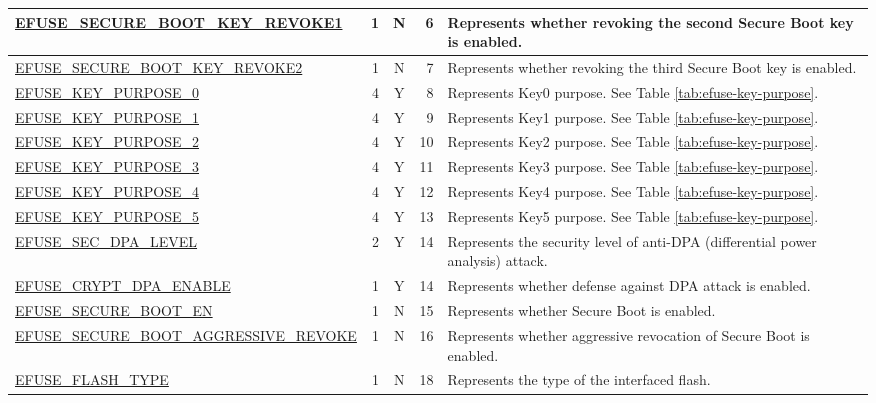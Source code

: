 \begin{longtable}[l]{ |m{8.2cm}|r|c|r|m{9cm}| }
    \hline
    \hyperref[fielddesc:EFUSESECUREBOOTKEYREVOKE1]{EFUSE\_SECURE\_BOOT\_KEY\_REVOKE1} & 1 & N & 6 & Represents whether revoking the second Secure Boot key is enabled.\\
    \hline
    \hyperref[fielddesc:EFUSESECUREBOOTKEYREVOKE2]{EFUSE\_SECURE\_BOOT\_KEY\_REVOKE2} & 1 & N & 7 & Represents whether revoking the third Secure Boot key is enabled.\\
    \hline
    \hyperref[fielddesc:EFUSEKEYPURPOSE0]{EFUSE\_KEY\_PURPOSE\_0} & 4 & Y & 8 & {Represents Key0 purpose. See Table \ref{tab:efuse-key-purpose}.} \\
    \hline
    \hyperref[fielddesc:EFUSEKEYPURPOSE1]{EFUSE\_KEY\_PURPOSE\_1} & 4 & Y & 9 & {Represents Key1 purpose. See Table \ref{tab:efuse-key-purpose}.} \\
    \hline
    \hyperref[fielddesc:EFUSEKEYPURPOSE2]{EFUSE\_KEY\_PURPOSE\_2} & 4 & Y & 10 & {Represents Key2 purpose. See Table \ref{tab:efuse-key-purpose}.} \\
    \hline
    \hyperref[fielddesc:EFUSEKEYPURPOSE3]{EFUSE\_KEY\_PURPOSE\_3} & 4 & Y & 11 & {Represents Key3 purpose. See Table \ref{tab:efuse-key-purpose}.} \\
    \hline
    \hyperref[fielddesc:EFUSEKEYPURPOSE4]{EFUSE\_KEY\_PURPOSE\_4} & 4 & Y & 12 & {Represents Key4 purpose. See Table \ref{tab:efuse-key-purpose}.} \\
    \hline
    \hyperref[fielddesc:EFUSEKEYPURPOSE5]{EFUSE\_KEY\_PURPOSE\_5} & 4 & Y & 13 & {Represents Key5 purpose. See Table \ref{tab:efuse-key-purpose}.} \\
    \hline
    \hyperref[fielddesc:EFUSESECDPALEVEL]{EFUSE\_SEC\_DPA\_LEVEL} & 2 & Y & 14 & Represents the security level of anti-DPA (differential power analysis) attack. \\
    \hline
    \hyperref[fielddesc:EFUSECRYPTDPAENABLE]{EFUSE\_CRYPT\_DPA\_ENABLE} & 1 & Y & 14 & Represents whether defense against DPA attack is enabled. \\
    \hline
    \hyperref[fielddesc:EFUSESECUREBOOTEN]{EFUSE\_SECURE\_BOOT\_EN} & 1 & N & 15 & Represents whether Secure Boot is enabled. \\
    \hline
    \hyperref[fielddesc:EFUSESECUREBOOTAGGRESSIVEREVOKE]{EFUSE\_SECURE\_BOOT\_AGGRESSIVE\_REVOKE} & 1 & N & 16 & Represents whether aggressive revocation of Secure Boot is enabled. \\
    \hline
    \hyperref[fielddesc:EFUSEFLASHTYPE]{EFUSE\_FLASH\_TYPE} & 1 & N & 18 & Represents the type of the interfaced flash. \\

\end{longtable}
